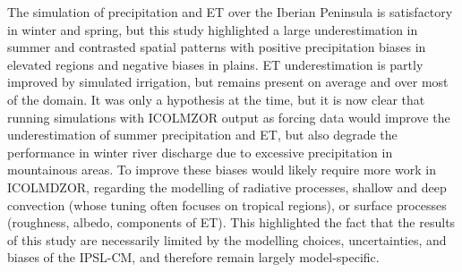 The simulation of precipitation and ET over the Iberian Peninsula is satisfactory in winter and spring, but this study highlighted a large underestimation in summer and contrasted spatial patterns with positive precipitation biases in elevated regions and negative biases in plains. ET underestimation is partly improved by simulated irrigation, but remains present on average and over most of the domain. 
It was only a hypothesis at the time, but it is now clear that running simulations with ICOLMZOR output as forcing data would improve the underestimation of summer precipitation and ET, but also degrade the performance in winter river discharge due to excessive precipitation in mountainous areas.
To improve these biases would likely require more work in ICOLMDZOR, regarding the modelling of radiative processes, shallow and deep convection (whose tuning often focuses on tropical regions), or surface processes (roughness, albedo, components of ET). This highlighted the fact that the results of this study are necessarily limited by the modelling choices, uncertainties, and biases of the IPSL-CM, and therefore remain largely model-specific.

